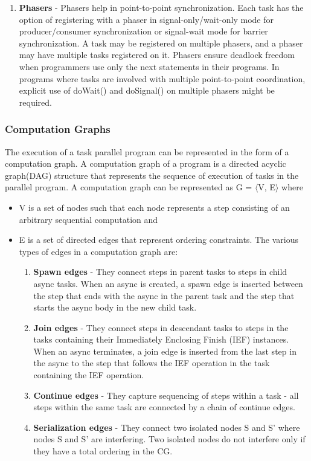 \begin{enumerate}
\begin{enumerate}
\item \textbf{Phasers} - Phasers help in point-to-point synchronization. Each task has the option of registering with a phaser in signal-only/wait-only mode for producer/consumer synchronization or signal-wait mode for barrier synchronization. A task may be registered on multiple phasers, and a phaser may have multiple tasks registered on it. Phasers ensure deadlock freedom when programmers use only the next statements in their programs. In programs where tasks are involved with multiple point-to-point coordination, explicit use of doWait() and doSignal() on multiple phasers might be required.  
\end{enumerate}
\end{enumerate}

\subsubsection{Computation Graphs}
The execution of a task parallel program can be represented in the form of a computation graph. A computation graph of a program is a directed acyclic graph(DAG) structure that represents the sequence of execution of tasks in the parallel program. A computation graph can be represented as G = $\langle$V, E$\rangle$ where
\begin{itemize}
\item V is a set of nodes such that  each node represents a step consisting of an arbitrary sequential computation and
\item E is a set of directed edges that represent ordering constraints. The various types of edges in a computation graph are:
\begin{enumerate}
 \item \textbf{Spawn edges} - They connect steps in parent tasks to steps in child async tasks. When an async is created, a spawn edge is inserted between the step that ends with the async in the parent task and the step that starts the async body in the new child task.
\item \textbf{Join edges} - They connect steps in descendant tasks to steps in the tasks containing their Immediately Enclosing Finish (IEF) instances. When an async terminates, a join edge is inserted from the last step in the async to the step that follows the IEF operation in the task containing the IEF operation.
\item \textbf{Continue edges} - They capture sequencing of steps within a task - all steps within the same task are connected by a chain of continue edges.
\item \textbf{Serialization edges} - They connect two isolated nodes S and S' where nodes S and S' are interfering. Two isolated nodes do not interfere only if they have a total ordering in the CG.
 \end{enumerate} 
\end{itemize}

